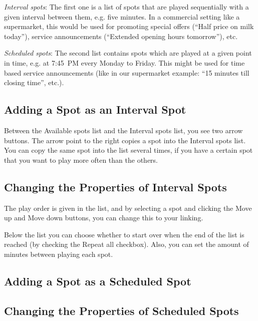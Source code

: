 \documentclass[a4paper,12pt]{report}
\begin{document}
{\em Interval spots}: The first one is a list of spots that are played sequentially with a given interval between them, e.g. five minutes. In a commercial setting like a supermarket, this would be used for promoting special offers (``Half price on milk today''), service announcements (``Extended opening hours tomorrow''), etc.

{\em Scheduled spots}: The second list contains spots which are played at a given point in time, e.g. at 7:45~PM every Monday to Friday. This might be used for time based service announcements (like in our supermarket example: ``15 minutes till closing time'', etc.).

\subsection{Adding a Spot as an Interval Spot}
Between the Available spots list and the Interval spots list, you see two arrow buttons. The arrow point to the right copies a spot into the Interval spots list. You can copy the same spot into the list several times, if you have a certain spot that you want to play more often than the others.

\subsection{Changing the Properties of Interval Spots}
The play order is given in the list, and by selecting a spot and clicking the Move up and Move down buttons, you can change this to your linking.

Below the list you can choose whether to start over when the end of the list is reached (by checking the Repeat all checkbox). Also, you can set the amount of minutes between playing each spot.

\subsection{Adding a Spot as a Scheduled Spot}

\subsection{Changing the Properties of Scheduled Spots}
\end{document}
